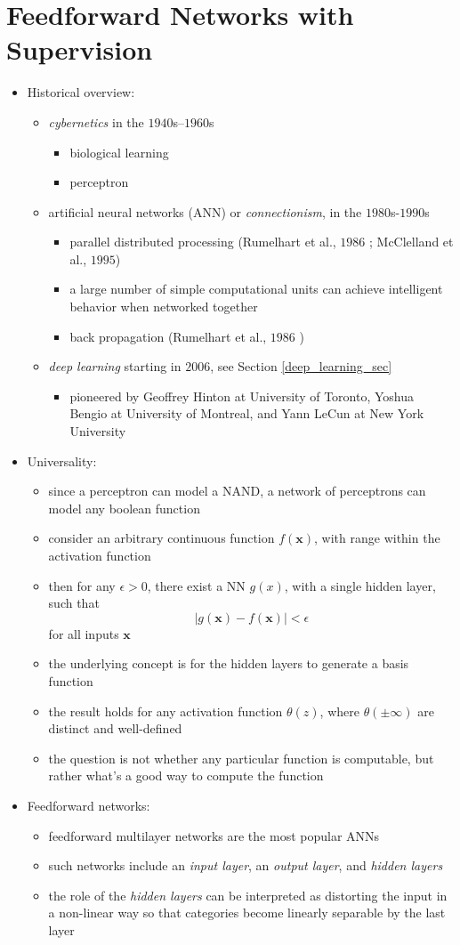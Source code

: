 \documentclass[onecolumn]{IEEEtran}
\newcommand{\beq}{\begin{equation}}
\newcommand{\eeq}{\end{equation}}
\newcommand{\bi}{\begin{itemize}}
\newcommand{\ei}{\end{itemize}}
\begin{document}
\section{Feedforward Networks with Supervision\label{fnn_section}}
\begin{itemize}
    \item Historical overview:
    \bi
        \item \emph{cybernetics} in the $1940$s–$1960$s
        \bi
            \item biological learning
            \item perceptron
        \ei
        \item artificial neural networks (ANN) or \emph{connectionism}, in the $1980$s-$1990$s
        \bi
            \item parallel distributed processing (Rumelhart et al., $1986$ ; McClelland et al., $1995$)
            \item a large number of simple computational units can achieve intelligent behavior when networked together
            \item back propagation (Rumelhart et al., $1986$ )
        \ei
        \item \emph{deep learning} starting in $2006$, see Section \ref{deep_learning_sec}
        \bi
            \item pioneered by Geoﬀrey Hinton at University of Toronto, Yoshua Bengio at University of Montreal, and Yann LeCun at New York University
        \ei
    \ei
    \item Universality:
    \bi
        \item since a perceptron can model a NAND, a network of perceptrons can model any boolean function
        \item consider an arbitrary continuous function $f(\bm{x})$, with range within the activation function
        \item then for any $\epsilon>0$, there exist a NN $g(x)$, with a single hidden layer, such that
         \beq
            |g(\bm{x}) - f(\bm{x})| < \epsilon
         \eeq
         for all inputs $\bm{x}$
         \item the underlying concept is for the hidden layers to generate a basis function
         \item the result holds for any activation function $\theta(z)$, where $\theta(\pm \infty)$ are distinct and well-defined
         \item the question is not whether any particular function is computable, but rather what's a good way to compute the function
    \ei
    \item Feedforward networks:
    \bi
        \item feedforward  multilayer networks are the most popular ANNs
        \item such networks include an \emph{input layer}, an \emph{output layer}, and \emph{hidden layers}
        \item the role of the \emph{hidden layers} can be interpreted as distorting the input in a non-linear way so that categories become linearly separable by the last layer
    \ei
\end{itemize}
\end{document}
